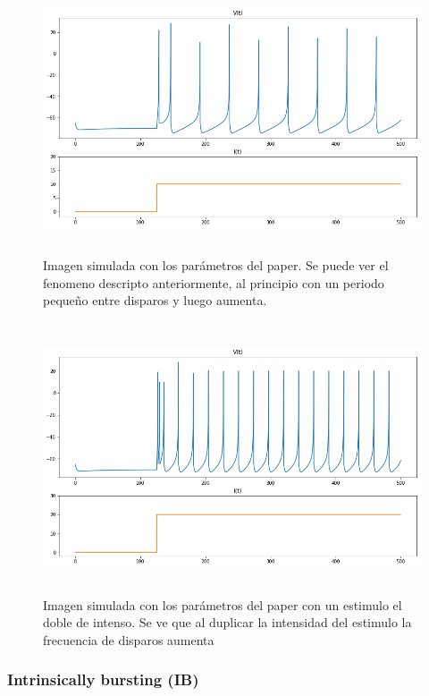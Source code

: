 \documentclass[12pt]{article}
\begin{document}
\begin{figure}[h]
    \centering
        \includegraphics[height=8cm]{images/RS_I10.png}
    \caption[fontsize=2pt]{Imagen simulada con los parámetros del paper. Se puede ver el fenomeno descripto anteriormente, al principio con un periodo pequeño entre disparos y luego aumenta.}
\end{figure}

\begin{figure}[h!]
    \centering
        \includegraphics[height=8cm]{images/RS_I20.png}
    \caption[fontsize=2pt]{Imagen simulada con los parámetros del paper con un estimulo el doble de intenso. Se ve que al duplicar la intensidad del estimulo la frecuencia de disparos aumenta}
\end{figure}
 \newpage

\subsubsection{Intrinsically bursting (IB)}
\end{document}
